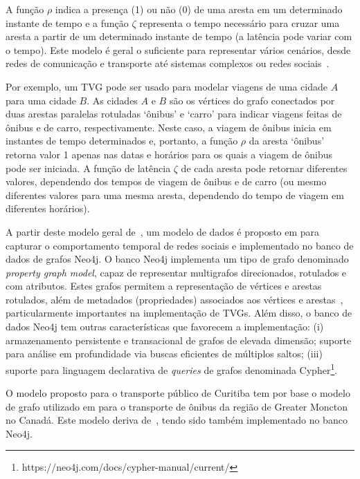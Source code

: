 A função $\rho$ indica a presença (1) ou não (0) de uma aresta em um determinado instante de tempo e a função $\zeta$ representa o tempo necessário para cruzar uma aresta a partir de um determinado instante de tempo (a latência pode variar com o tempo). Este modelo é geral o suficiente para representar vários cenários, desde redes de comunicação e transporte até sistemas complexos ou redes sociais~\cite{sant:12}. 

Por exemplo, um TVG pode ser usado para modelar viagens de uma cidade $A$ para uma cidade $B$. As cidades $A$ e $B$ são os vértices do grafo conectados por duas arestas paralelas rotuladas `ônibus' e `carro' para indicar viagens feitas de ônibus e de carro, respectivamente. Neste caso, a viagem de ônibus inicia em instantes de tempo determinados e, portanto, a função $\rho$ da aresta `ônibus' retorna valor 1 apenas nas datas e horários para os quais a viagem de ônibus pode ser iniciada. A função de latência $\zeta$ de cada aresta  pode retornar diferentes valores, dependendo dos tempos de viagem de ônibus e de carro (ou mesmo diferentes valores para uma mesma aresta, dependendo do tempo de viagem em diferentes horários).

A partir deste modelo geral de~\cite{sant:12}, um modelo de dados é proposto em \cite{cat:13} para capturar o comportamento temporal de redes sociais e implementado no banco de dados de grafos Neo4j. O banco Neo4j implementa um tipo de grafo denominado \emph{property graph model}, capaz de representar multigrafos direcionados, rotulados e com atributos. Estes grafos permitem a representação de vértices e arestas rotulados, além de metadados (propriedades) associados aos vértices e arestas~\cite{rod:10}, particularmente importantes na implementação de TVGs. Além disso, o banco de dados Neo4j tem outras características que favorecem a implementação: (i) armazenamento persistente e transacional de grafos de elevada dimensão; suporte para análise em profundidade via buscas eficientes de múltiplos saltos; (iii) suporte para linguagem declarativa de \emph{queries} de grafos denominada Cypher\footnote{https://neo4j.com/docs/cypher-manual/current/}.

O modelo proposto para o transporte público de Curitiba tem por base o modelo de grafo utilizado em \cite{wach:19} para o transporte de ônibus da região de Greater Moncton no Canadá. Este modelo deriva de~\cite{cat:13}, tendo sido também implementado no banco Neo4j.


